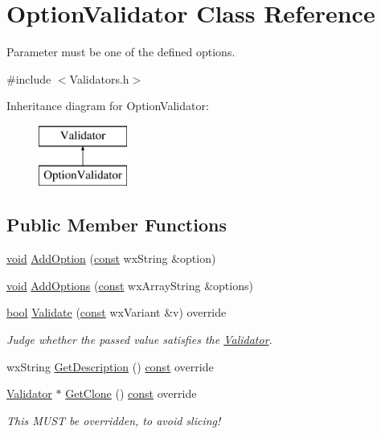\hypertarget{class_option_validator}{}\section{Option\+Validator Class Reference}
\label{class_option_validator}


Parameter must be one of the defined options.  




{\ttfamily \#include $<$Validators.\+h$>$}

Inheritance diagram for Option\+Validator\+:\begin{figure}[H]
\begin{center}
\leavevmode
\includegraphics[height=2.000000cm]{class_option_validator}
\end{center}
\end{figure}
\subsection*{Public Member Functions}
\begin{DoxyCompactItemize}
\item 
\hyperlink{sound_8c_ae35f5844602719cf66324f4de2a658b3}{void} \hyperlink{class_option_validator_a8c8c31acae2ec6af281be66fc13862f9}{Add\+Option} (\hyperlink{getopt1_8c_a2c212835823e3c54a8ab6d95c652660e}{const} wx\+String \&option)
\item 
\hyperlink{sound_8c_ae35f5844602719cf66324f4de2a658b3}{void} \hyperlink{class_option_validator_ad8850711910638aea10a37d946f9ae74}{Add\+Options} (\hyperlink{getopt1_8c_a2c212835823e3c54a8ab6d95c652660e}{const} wx\+Array\+String \&options)
\item 
\hyperlink{mac_2config_2i386_2lib-src_2libsoxr_2soxr-config_8h_abb452686968e48b67397da5f97445f5b}{bool} \hyperlink{class_option_validator_a047507466786fdaa4dc252a2120d4ced}{Validate} (\hyperlink{getopt1_8c_a2c212835823e3c54a8ab6d95c652660e}{const} wx\+Variant \&v) override
\begin{DoxyCompactList}\small\item\em Judge whether the passed value satisfies the \hyperlink{class_validator}{Validator}. \end{DoxyCompactList}\item 
wx\+String \hyperlink{class_option_validator_a87bca6181cb6ce56c11808cb612df02b}{Get\+Description} () \hyperlink{getopt1_8c_a2c212835823e3c54a8ab6d95c652660e}{const}  override
\item 
\hyperlink{class_validator}{Validator} $\ast$ \hyperlink{class_option_validator_ac45289afed9190ce90ec10476ea68bbf}{Get\+Clone} () \hyperlink{getopt1_8c_a2c212835823e3c54a8ab6d95c652660e}{const}  override
\begin{DoxyCompactList}\small\item\em This M\+U\+ST be overridden, to avoid slicing! \end{DoxyCompactList}\end{DoxyCompactItemize}


